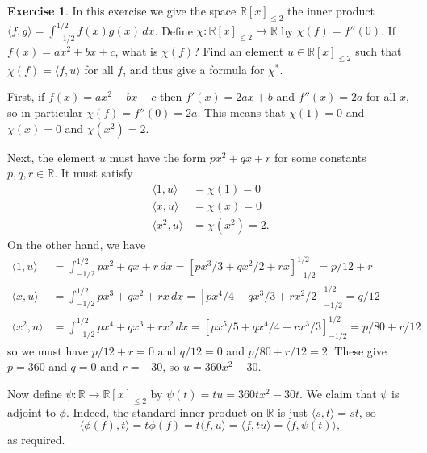 \documentclass{amsart}
\newcommand{\R}         {{\mathbb{R}}}
\newcommand{\ip}[1]     {\langle #1\rangle}
\renewcommand{\:}       {\colon}
\theoremstyle{definition}
\newtheorem{exercise}{Exercise}[section]
\renewenvironment{solution}{\SolutionAtEnd}{\endSolutionAtEnd}
\begin{document}
\begin{exercise}
 In this exercise we give the space $\R[x]_{\leq 2}$ the
 inner product $\ip{f,g}=\int_{-1/2}^{1/2}f(x)g(x)\,dx$.
 Define $\chi\:\R[x]_{\leq 2}\to\R$ by $\chi(f)=f''(0)$.  If
 $f(x)=ax^2+bx+c$, what is $\chi(f)$?  Find an element
 $u\in\R[x]_{\leq 2}$ such that $\chi(f)=\ip{f,u}$ for all
 $f$, and thus give a formula for $\chi^*$.
\end{exercise}
\begin{solution}
 First, if $f(x)=ax^2+bx+c$ then $f'(x)=2ax+b$ and
 $f''(x)=2a$ for all $x$, so in particular
 $\chi(f)=f''(0)=2a$.  This means that $\chi(1)=0$ and
 $\chi(x)=0$ and $\chi(x^2)=2$.

 Next, the element $u$ must have the form $px^2+qx+r$ for some
 constants $p,q,r\in\R$.  It must satisfy
 \begin{align*}
  \ip{1,u} &= \chi(1) = 0 \\
  \ip{x,u} &= \chi(x) = 0 \\
  \ip{x^2,u} &= \chi(x^2) = 2.
 \end{align*}
 On the other hand, we have 
 \begin{align*}
  \ip{1,u}
   &= \int_{-1/2}^{1/2} px^2+qx+r\,dx 
    = \left[ px^3/3 + qx^2/2 + rx \right]_{-1/2}^{1/2}
    = p/12 + r \\
  \ip{x,u}
   &= \int_{-1/2}^{1/2} px^3+qx^2+rx\,dx 
    = \left[ px^4/4 + qx^3/3 + rx^2/2 \right]_{-1/2}^{1/2}
    = q/12 \\
  \ip{x^2,u}
   &= \int_{-1/2}^{1/2} px^4+qx^3+rx^2\,dx 
    = \left[ px^5/5 + qx^4/4 + rx^3/3 \right]_{-1/2}^{1/2}
    = p/80 + r/12
 \end{align*}
 so we must have
 $p/12+r=0$ and $q/12=0$ and $p/80+r/12=2$.  These give
 $p=360$ and $q=0$ and $r=-30$, so $u=360x^2-30$.  

 Now define $\psi\:\R\to\R[x]_{\leq 2}$ by $\psi(t)=tu=360
 tx^2-30t$.  We claim that $\psi$ is adjoint to $\phi$.
 Indeed, the standard inner product on $\R$ is just
 $\ip{s,t}=st$, so
 \[ \ip{\phi(f),t} = t\phi(f)=t\ip{f,u}=\ip{f,tu}=\ip{f,\psi(t)},
 \]
 as required.
\end{solution}
\end{document}
